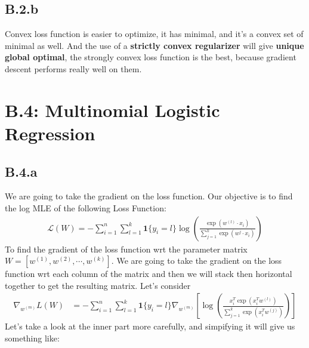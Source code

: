 \documentclass[]{article}
\begin{document}
    \subsection*{B.2.b}
        Convex loss function is easier to optimize, it has minimal, and it's a convex set of minimal as well. And the use of a \textbf{strictly convex regularizer} will give \textbf{unique global optimal}, the strongly convex loss function is the best, because gradient descent performs really well on them. 
\section*{B.4: Multinomial Logistic Regression}
    \subsection*{B.4.a}
        We are going to take the gradient on the loss function. Our objective is to find the log MLE of the following Loss Function: 
        \begin{align*}\tag{B.4.1}\label{eqn:B.4.1}
            \mathcal{L}(W) = - \sum_{i = 1}^{n} \sum_{l = 1}^{k}
                \mathbf{1}\{y_i = l\} \log \left(
                    \frac{\exp \left(
                        w^{(l)}\cdot x_i
                    \right)}{
                        \sum_{j = 1}^{k}
                        \exp \left(
                            w^{j}\cdot x_i
                        \right)
                    }
                \right)
        \end{align*}
        To find the gradient of the loss function wrt the parameter matrix $W = [w^{(1)}, w^{(2)}, \cdots,w^{(k)}]$. We are going to take the gradient on the loss function wrt each column of the matrix and then we will stack then horizontal together to get the resulting matrix. Let's consider
        \begin{align*}\tag{B.4.2}\label{eqn:B.4.2}
            \nabla_{w^{(m)}}L(W) 
            &= 
            -\sum_{i = 1}^{n}
            \sum_{l = 1}^{k}
                \mathbf{1}\{y_i = l\}
                \nabla_{w^{(m)}} \left[
                    \log \left(
                    \frac{x_i^T\exp(x_i^Tw^{(l)})}{
                        \sum_{j = 1}^{k}
                            \exp(x_i^T w^{(j)})
                    }
                    \right)
                \right]
        \end{align*}
        Let's take a look at the inner part more carefully, and simpifying it will give us something like: 
\end{document}
